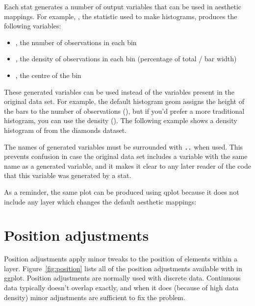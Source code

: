 Each stat generates a number of output variables that can be used in aesthetic mappings.  For example, , the statistic used to make histograms, produces the following variables:

\begin{itemize}
  \item {}, the number of observations in each bin
  \item {}, the density of observations in each bin (percentage of total / bar width)
  \item {}, the centre of the bin
\end{itemize}

These generated variables can be used instead of the variables present in the original data set.  For example, the default histogram geom assigns the height of the bars to the number of observations (), but if you'd prefer a more traditional histogram, you can use the density ().   The following example shows a density histogram of  from the diamonds dataset.

% 


The names of generated variables must be surrounded with {\tt ..} when used.  This prevents confusion in case the original data set includes a variable with the same name as a generated variable, and it makes it clear to any later reader of the code that this variable was generated by a stat.

As a reminder, the same plot can be produced using qplot because it does not include any layer which changes the default aesthetic mappings:

% 


\section{Position adjustments}
\label{sec:position}

Position adjustments apply minor tweaks to the position of elements within a layer.  Figure~\ref{fig:position} lists all of the position adjustments available with in ggplot.  Position adjustments are normally used with discrete data.  Continuous data typically doesn't overlap exactly, and when it does (because of high data density) minor adjustments are sufficient to fix the problem.

